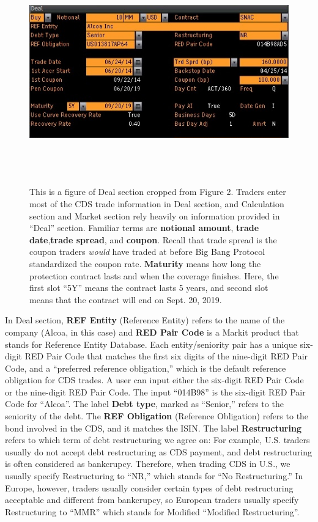 \documentclass{jss}
\begin{document}
\begin{figure}[H]
\centering
\includegraphics[width=6.3in, height=3.8in]{images/AlcoaIncCDSDeal.jpg}
\caption{This is a figure of Deal section cropped from Figure 2. Traders enter most of the CDS trade information in Deal section, and Calculation section and Market section rely heavily on information provided in ``Deal'' section. Familiar terms are \textbf{notional amount}, \textbf{trade date},\textbf{trade spread}, and \textbf{coupon}. Recall that trade spread is the coupon traders \textit{would} have traded at before Big Bang Protocol standardized the coupon rate. \textbf{Maturity} means how long the protection contract lasts and when the coverage finishes. Here, the first slot ``5Y'' means the contract lasts 5 years, and second slot means that the contract will end on Sept. 20, 2019.}
\label{deal}
\end{figure}

In Deal section, \textbf{REF Entity} (Reference Entity) refers to the name of the company (Alcoa, in this case) and \textbf{RED Pair Code} is a Markit product that stands for Reference Entity Database. Each entity/seniority pair has a unique six-digit RED Pair Code that matches the first six digits of the nine-digit RED Pair Code, and a ``preferred reference obligation,'' which is the default reference obligation for CDS  trades. A user can input either the six-digit RED Pair Code or the nine-digit RED Pair Code. The input ``014B98'' is the six-digit RED Pair Code for ``Alcoa''. The label \textbf{Debt type}, marked as ``Senior,'' refers to the seniority of the debt. The \textbf{REF Obligation} (Reference Obligation) refers to the bond involved in the CDS, and it matches the ISIN. The label \textbf{Restructuring} refers to which term of debt restructuring we agree on: For example, U.S. traders usually do not accept debt restructuring as CDS payment, and debt restructuring is often considered as bankcrupcy. Therefore, when trading CDS in U.S., we usually specify Restructuring to ``NR,'' which stands for ``No Restructuring.'' In Europe, however, traders usually consider certain types of debt restructuring acceptable and different from bankcrupcy, so European traders usually specify Restructuring to ``MMR'' which stands for Modified ``Modified Restructuring''. 
\end{document}

